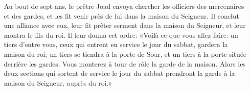 Au bout de sept ans,
	le prêtre Joad envoya chercher les officiers des mercenaires et des gardes,
	et les fit venir près de lui dans la maison du Seigneur.
Il conclut une alliance avec eux,
	leur fit prêter serment dans la maison du Seigneur, et leur montra le fils du roi.
Il leur donna cet ordre: «Voilà ce que vous allez faire:
	un tiers d’entre vous, ceux qui entrent en service le jour du sabbat,
	gardera la maison du roi;
	un tiers se tiendra à la porte de Sour,
	et un tiers à la porte située derrière les gardes.
Vous monterez à tour de rôle la garde de la maison.
Alors les deux sections qui sortent de service le jour du sabbat
	prendront la garde à la maison du Seigneur, auprès du roi.»
